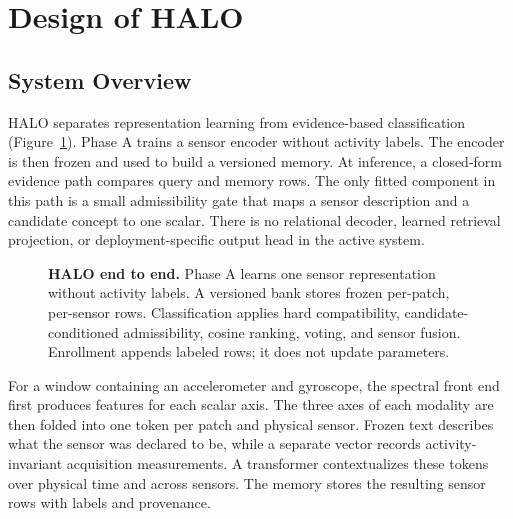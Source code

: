 \section{Design of HALO}
\label{sec:design}

\subsection{System Overview}
\label{sec:overview}
\label{sec:requirements}

HALO separates representation learning from evidence-based classification
(Figure~\ref{fig:overview}). Phase A trains a sensor encoder without activity labels. The encoder is
then frozen and used to build a versioned memory. At inference, a closed-form evidence path compares
query and memory rows. The only fitted component in this path is a small admissibility gate that
maps a sensor description and a candidate concept to one scalar. There is no relational decoder,
learned retrieval projection, or deployment-specific output head in the active system.

\begin{figure}[t]
  \centering
  \setlength{\abovecaptionskip}{4pt}
  \setlength{\belowcaptionskip}{-5pt}
  
  \caption{\textbf{HALO end to end.} Phase A learns one sensor representation without activity
  labels. A versioned bank stores frozen per-patch, per-sensor rows. Classification applies hard
  compatibility, candidate-conditioned admissibility, cosine ranking, voting, and sensor fusion.
  Enrollment appends labeled rows; it does not update parameters.}
  \label{fig:overview}
\end{figure}

For a window containing an accelerometer and gyroscope, the spectral front end first produces
features for each scalar axis. The three axes of each modality are then folded into one token per
patch and physical sensor. Frozen text describes what the sensor was declared to be, while a
separate vector records activity-invariant acquisition measurements. A transformer contextualizes
these tokens over physical time and across sensors. The memory stores the resulting sensor rows
with labels and provenance.

